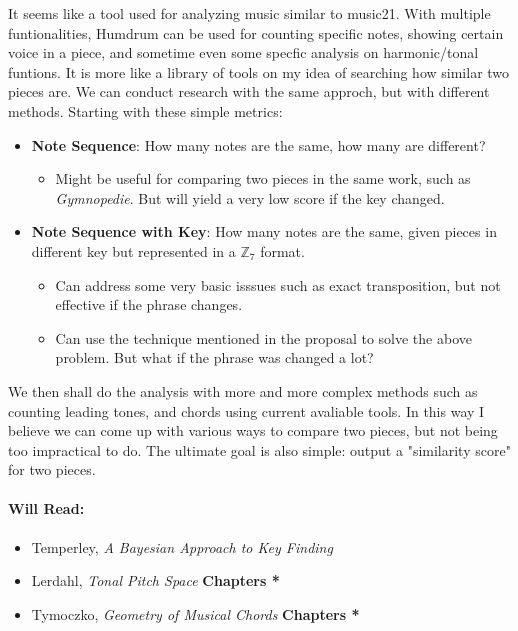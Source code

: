 It seems like a tool used for analyzing music similar to music21. With multiple 
funtionalities, Humdrum can be used for counting specific notes, showing certain
voice in a piece, and sometime even some specfic analysis on 
harmonic/tonal funtions. It is more like a library of tools on my idea of 
searching how similar two pieces are. We can conduct research with the same
approch, but with different methods. Starting with these simple metrics:
\begin{itemize}
    \item \textbf{Note Sequence}: How many notes are the same, how many are different?
        \begin{itemize}
            \item Might be useful for comparing two pieces in the same work, such as 
            \emph{Gymnopedie}. But will yield a very low score if the key changed.
        \end{itemize}
    \item \textbf{Note Sequence with Key}: How many notes are the same, given pieces 
    in different key but represented in a $\mathbb{Z}_7$ format.
    \begin{itemize}
        \item Can address some very basic isssues such as exact transposition,
        but not effective if the phrase changes. 
        \item Can use the technique mentioned in the proposal to
        solve the above problem. But what if the phrase was changed a lot?
    \end{itemize}
\end{itemize}
We then shall do the analysis with more and more complex methods such as counting
leading tones, and chords using current avaliable tools. In this way I believe we can come up with 
various ways to compare two pieces, but not being too impractical to do. The ultimate
goal is also simple: output a "similarity score" for two pieces.
\paragraph*{Will Read:}
\begin{itemize}
    \item Temperley, \emph{A Bayesian Approach to Key Finding}
    \item Lerdahl, \emph{Tonal Pitch Space} \textbf{Chapters *}
    \item Tymoczko, \emph{Geometry of Musical Chords} \textbf{Chapters *} 
\end{itemize}

